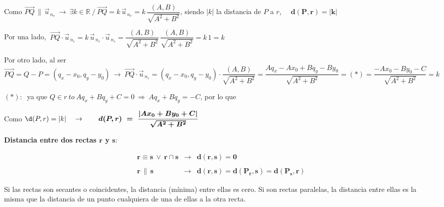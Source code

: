 Como $\overrightarrow{PQ}\, \parallel \, \vec u_{\, n_r} \ \to \ \exists k\in \mathbb R \ / \ \overrightarrow{PQ}=k\, \vec u_{\, n_r}=k\, \dfrac{(A,B)}{\sqrt{A^2+B^2}}$,
siendo $|k|$ la distancia de $P$ a $r$, $\quad \boldsymbol{d(P,r)=|k|}$
	
Por una lado, $\ \overrightarrow{PQ} \cdot \vec u_{\, n_r}=k\, \vec u_{\, n_r}\cdot \vec u_{\, n_r}=\dfrac{(A,B)}{\sqrt{A^2+B^2}}\, \dfrac{(A,B)}{\sqrt{A^2+B^2}} =k\, 1 =k$

Por otro lado, al ser $\overrightarrow{PQ}=Q-P=(q_x-x_0,q_y-y_0) \ \to \ 
 \overrightarrow{PQ} \cdot \vec u_{\, n_r} = (q_x-x_0,q_y-y_0)\cdot \dfrac{(A,B)}{\sqrt{A^2+B^2}}= \dfrac{Aq_x-Ax_0+Bq_y-By_0}{\sqrt{A^2+B^2}}= (*)= \dfrac{-Ax_0-By_0-C}{\sqrt{A^2+B^2}}=k$
 
$(*):\ $  ya que $Q\in r \ to \ Aq_x+Bq_y+C=0 \ \Rightarrow \  Aq_x+Bq_y=-C$, por lo que

Como $\d(P,r)=|k| \quad \to \qquad \boldsymbol{ d(P,r) \ = \ \dfrac{|Ax_0+By_0+C|}{\sqrt{A^2+B^2}} }$ \QED




\vspace{5mm}
\begin{large}
\textbf{Distancia entre dos rectas $\boldsymbol{r}$ y $\boldsymbol{s}$}:	
\end{large}
\begin{theorem}

$$\boldsymbol{ \begin{array}{ccc}
r\equiv s \ \vee \ r\cap s & \longrightarrow & d(r,s)=0 \\ \\
r\, \parallel \, s & \longrightarrow & d(r,s)=d(P_r,s)=d(P_s,r)
\end{array} }$$
	
\end{theorem}

Si las rectas son secantes o coincidentes, la distancia (mínima) entre ellas es cero. Si son rectas paralelas, la distancia entre ellas es la misma que la distancia de un punto cualquiera de una de ellas a la otra recta.


\vspace{5mm}

